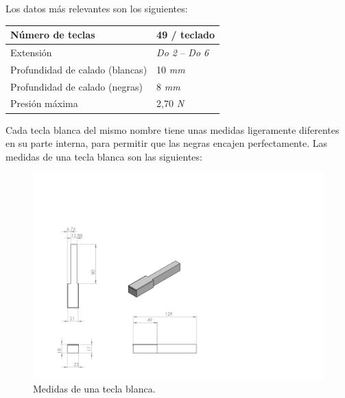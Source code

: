 
Los datos más relevantes son los siguientes:

\begin{center}
	\begin{tabular}{|l|l|}
		\hline Número de teclas & 49 / teclado \\
		\hline Extensión & \textit{Do 2} -- \textit{Do 6} \\
		\hline Profundidad de calado (blancas) & 10 \textit{mm} \\
		\hline Profundidad de calado (negras) & 8 \textit{mm} \\
		\hline Presión máxima & 2,70 \textit{N} \\
		\hline
	\end{tabular}
\end{center}

Cada tecla blanca del mismo nombre tiene unas medidas ligeramente diferentes en su parte interna, para permitir que las negras encajen perfectamente. Las medidas de una tecla blanca son las siguientes:

\smallskip

\begin{figure}[H]
	\noindent \begin{centering}
		\includegraphics[clip=true,trim=0 0 360 150, width=\linewidth/2]{capitulo3/blanca_modelo}
		\par\end{centering}
	\smallskip
	\caption{\label{fig:blanca_modelo} Medidas de una tecla blanca.}
\end{figure} 

